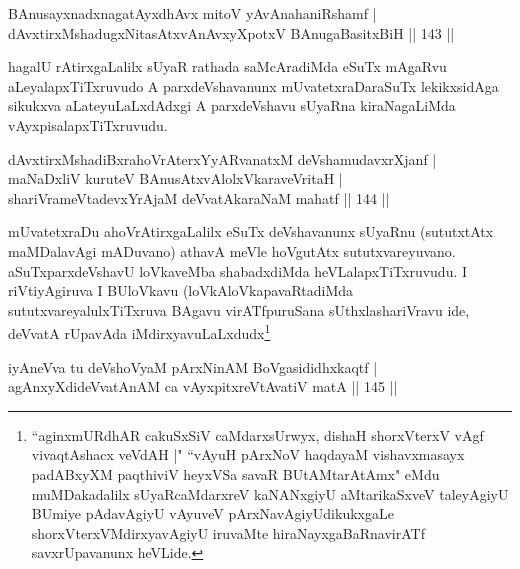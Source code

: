 
\begin{shl}
BAnusayxnadxnagatAyx\s dhAvx mitoV yAvAnahaniRshamf |\\
dAvxtirxMshadugxNitasAtxvAnAvxyXpotxV BAnugaBasitxBiH \hfill || 143 ||
\end{shl}

\begin{artha}
hagalU rAtirxgaLalilx sUyaR rathada saMcAradiMda eSuTx mAgaRvu aLeyalapxTiTxruvudo A parxdeVshavanunx mUvatetxraDaraSuTx lekikxsidAga sikukxva aLateyuLaLxdAdxgi A parxdeVshavu sUyaRna kiraNagaLiMda vAyxpisalapxTiTxruvudu.
\end{artha}


\begin{shl}
dAvxtirxMshadiBxrahoVrAterxYyARvanatxM deVshamudavxrXjanf |\\
maNaDxliV kuruteV BAnusAtxvAlolxVkaraveVritaH |\\
shariVrameVtadevxYrAjaM deVvatAkaraNaM mahatf \hfill || 144 ||
\end{shl}

\begin{artha}
mUvatetxraDu ahoVrAtirxgaLalilx eSuTx deVshavanunx sUyaRnu (sututxtAtx maMDalavAgi mADuvano) athavA meVle hoVgutAtx sututxvareyuvano. aSuTxparxdeVshavU loVkaveMba shabadxdiMda heVLalapxTiTxruvudu. I riVtiyAgiruva I BUloVkavu (loVkAloVkapavaRtadiMda sututxvareyalulxTiTxruva BAgavu virATfpuruSana sUthxlashariVravu ide, deVvatA rUpavAda iMdirxyavuLaLxdudx\footnote{``aginxmURdhAR cakuSxSiV caMdarxsUrwyx, dishaH shorxVterxV vAgf vivaqtAshacx veVdAH |" ``vAyuH pArxNoV haqdayaM vishavxmasayx padABxyXM paqthiviV heyxVSa savaR BUtAMtarAtAmx" eMdu muMDakadalilx sUyaRcaMdarxreV kaNANxgiyU aMtarikaSxveV taleyAgiyU BUmiye pAdavAgiyU vAyuveV pArxNavAgiyUdikukxgaLe shorxVterxVMdirxyavAgiyU iruvaMte hiraNayxgaBaRnavirATf savxrUpavanunx heVLide.}
\end{artha}


\begin{shl}
iyAneVva tu deVshoV\s yaM pArxNinAM BoVgasididhxkaqtf |\\
agAnxyXdideVvatAnAM ca vAyxpitxreVtAvatiV matA \hfill || 145 ||
\end{shl}

